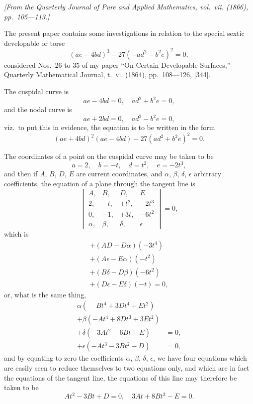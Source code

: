 \documentclass[11pt,a4paper]{article}
\begin{document}
\begin{flushright}
\small\textit{[From the Quarterly Journal of Pure and Applied Mathematics, vol.~vii. (1866), pp.~105---113.]}
\end{flushright}

\vspace{6pt}

\noindent
The present paper contains some investigations in relation to the special sextic developable or torse
\[
(ae - 4bd)^{3} - 27(-ad^{2} - b^{2}e)^{2} = 0,
\]
considered Nos.~26 to 35 of my paper ``On Certain Developable Surfaces,'' Quarterly Mathematical Journal, t.~\textsc{vi}. (1864), pp.~108---126, [344].

The cuspidal curve is
\[
ae - 4bd = 0,\quad ad^{2} + b^{2}e = 0,
\]
and the nodal curve is
\[
ae + 2bd = 0,\quad ad^{2} - b^{2}e = 0,
\]
viz.~to put this in evidence, the equation is to be written in the form
\[
(ae + 4bd)^{2}(ae - 4bd) - 27(ad^{2} + b^{2}e)^{2} = 0.
\]

The coordinates of a point on the cuspidal curve may be taken to be
\[
a = 2,\quad b = -t,\quad d = t^{2},\quad e = -2t^{3},
\]
and then if $A$, $B$, $D$, $E$ are current coordinates, and $\alpha$, $\beta$, $\delta$, $\epsilon$ arbitrary coefficients, the equation of a plane through the tangent line is
\[
\begin{vmatrix}
A, & B, & D, & E \\
2, & -t, & +t^{2}, & -2t^{3} \\
0, & -1, & +3t, & -6t^{2} \\
\alpha, & \beta, & \delta, & \epsilon
\end{vmatrix}
= 0,
\]
which is
\begin{multline*}
+ (AD - D\alpha)(-3t^{4})\\
+ (A\epsilon - E\alpha)(-t^{2})\\
+ (B\delta - D\beta)(-6t^{2})\\
+ (D\epsilon - E\delta)(-t) = 0,
\end{multline*}
or, what is the same thing,
\begin{align*}
\alpha(\phantom{-}Bt^{4} + 3Dt^{4} + Et^{2})\\
+ \beta(-At^{4} + 8Dt^{3} + 3Et^{2})\\
+ \delta(-3At^{2} - 6Bt + E) &= 0,\\
+ \epsilon(-At^{3} - 3Bt^{2} - D) &= 0,
\end{align*}
and by equating to zero the coefficients $\alpha$, $\beta$, $\delta$, $\epsilon$, we have four equations which are easily seen to reduce themselves to two equations only, and which are in fact the equations of the tangent line, the equations of this line may therefore be taken to be
\[
At^{2} - 3Bt + D = 0,\quad 3At + 8Bt^{2} - E = 0.
\]
\end{document}
